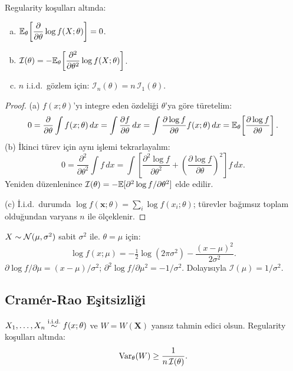 \begin{teorem}\label{thm:fisher_hesap}
Regularity koşulları altında:
\begin{enumerate}[(a)]
  \item $\mathbb{E}_\theta\!\left[\dfrac{\partial}{\partial\theta}\log f(X;\theta)\right] = 0$.
  \item $\mathcal{I}(\theta) = -\mathbb{E}_\theta\!\left[\dfrac{\partial^2}{\partial\theta^2}\log f(X;\theta)\right]$.
  \item $n$ i.i.d.\ gözlem için: $\mathcal{I}_n(\theta) = n\,\mathcal{I}_1(\theta)$.
\end{enumerate}
\end{teorem}

\begin{proof}
(a) $f(x;\theta)$'yı integre eden özdeliği $\theta$'ya göre türetelim:
\[
  0 = \frac{\partial}{\partial\theta}\int f(x;\theta)\,dx
  = \int \frac{\partial f}{\partial\theta}\,dx
  = \int \frac{\partial\log f}{\partial\theta} f(x;\theta)\,dx
  = \mathbb{E}_\theta\!\left[\frac{\partial\log f}{\partial\theta}\right].
\]
(b) İkinci türev için aynı işlemi tekrarlayalım:
\[
  0 = \frac{\partial^2}{\partial\theta^2}\int f\,dx
  = \int\!\left[\frac{\partial^2\log f}{\partial\theta^2} + \left(\frac{\partial\log f}{\partial\theta}\right)^{\!2}\right]f\,dx.
\]
Yeniden düzenlenince $\mathcal{I}(\theta) = -\mathbb{E}[\partial^2\log f/\partial\theta^2]$ elde edilir.

(c) İ.i.d.\ durumda $\log f(\mathbf{x};\theta) = \sum_i \log f(x_i;\theta)$; türevler bağımsız toplam olduğundan varyans $n$ ile ölçeklenir.
\end{proof}

\begin{ornek}
$X\sim\mathcal{N}(\mu,\sigma^2)$ sabit $\sigma^2$ ile. $\theta=\mu$ için:
\[
  \log f(x;\mu) = -\tfrac{1}{2}\log(2\pi\sigma^2) - \frac{(x-\mu)^2}{2\sigma^2}.
\]
$\partial\log f/\partial\mu = (x-\mu)/\sigma^2$; $\partial^2\log f/\partial\mu^2 = -1/\sigma^2$. Dolayısıyla $\mathcal{I}(\mu) = 1/\sigma^2$.
\end{ornek}

\subsection{Cramér-Rao Eşitsizliği}

\begin{teorem}\label{thm:cramer_rao}
$X_1,\ldots,X_n \overset{\text{i.i.d.}}{\sim} f(x;\theta)$ ve $W = W(\mathbf{X})$ yansız tahmin edici olsun. Regularity koşulları altında:
\[
  \operatorname{Var}_\theta(W) \geq \frac{1}{n\,\mathcal{I}(\theta)}.
\]
\end{teorem}

